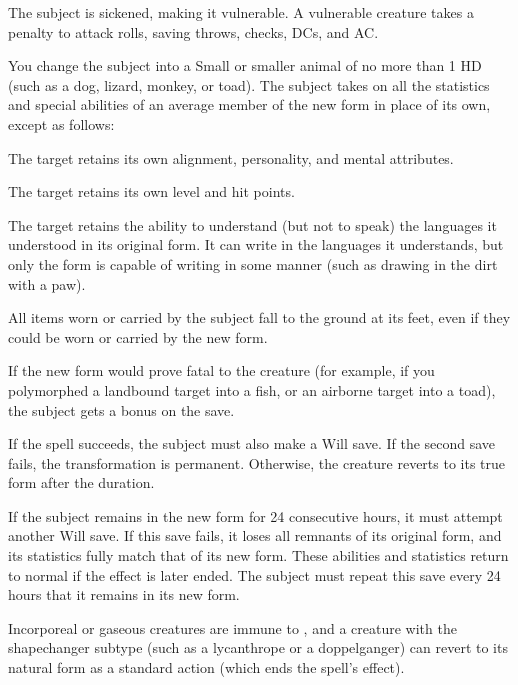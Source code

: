 \begin{spellhealthy}
  The subject is sickened, making it vulnerable. A vulnerable creature takes a  penalty to attack rolls, saving throws, checks, DCs, and AC.
\end{spellhealthy}
\begin{spellblood}
  You change the subject into a Small or smaller animal of no more than 1 HD (such as a dog, lizard, monkey, or toad). The subject takes on all the statistics and special abilities of an average member of the new form in place of its own, except as follows:
  \begin{itemize*} 
    \item The target retains its own alignment, personality, and mental attributes.
    \item The target retains its own level and hit points.
    \item The target retains the ability to understand (but not to speak) the languages it understood in its original form. It can write in the languages it understands, but only the form is capable of writing in some manner (such as drawing in the dirt with a paw). 
  \end{itemize*}

  All items worn or carried by the subject fall to the ground at its feet, even if they could be worn or carried by the new form. 

  If the new form would prove fatal to the creature (for example, if you polymorphed a landbound target into a fish, or an airborne target into a toad), the subject gets a  bonus on the save. 

  If the spell succeeds, the subject must also make a Will save. If the second save fails, the transformation is permanent. Otherwise, the creature reverts to its true form after the \durshort duration.

  If the subject remains in the new form for 24 consecutive hours, it must attempt another Will save. If this save fails, it loses all remnants of its original form, and its statistics fully match that of its new form. These abilities and statistics return to normal if the effect is later ended. The subject must repeat this save every 24 hours that it remains in its new form.
\end{spellblood}
\begin{spellnotes}
    Incorporeal or gaseous creatures are immune to , and a creature with the shapechanger subtype (such as a lycanthrope or a doppelganger) can revert to its natural form as a standard action (which ends the spell's effect). 
\end{spellnotes}

